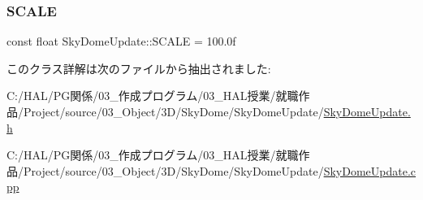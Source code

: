 \subsubsection{\texorpdfstring{S\+C\+A\+LE}{SCALE}}
{\footnotesize\ttfamily const float Sky\+Dome\+Update\+::\+S\+C\+A\+LE = 100.\+0f\hspace{0.3cm}{\ttfamily [static]}}



このクラス詳解は次のファイルから抽出されました\+:\begin{DoxyCompactItemize}
\item 
C\+:/\+H\+A\+L/\+P\+G関係/03\+\_\+作成プログラム/03\+\_\+\+H\+A\+L授業/就職作品/\+Project/source/03\+\_\+\+Object/3\+D/\+Sky\+Dome/\+Sky\+Dome\+Update/\mbox{\hyperlink{_sky_dome_update_8h}{Sky\+Dome\+Update.\+h}}\item 
C\+:/\+H\+A\+L/\+P\+G関係/03\+\_\+作成プログラム/03\+\_\+\+H\+A\+L授業/就職作品/\+Project/source/03\+\_\+\+Object/3\+D/\+Sky\+Dome/\+Sky\+Dome\+Update/\mbox{\hyperlink{_sky_dome_update_8cpp}{Sky\+Dome\+Update.\+cpp}}\end{DoxyCompactItemize}
